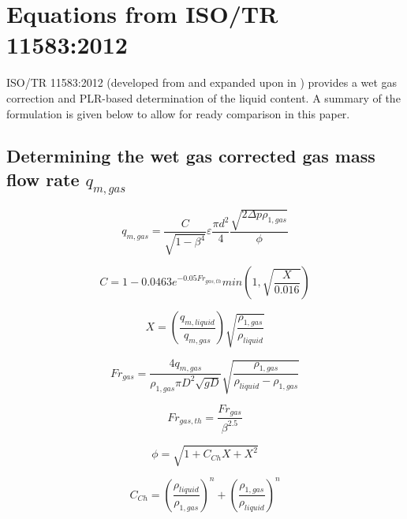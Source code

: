\documentclass[journal]{IEEEtran}
\begin{document}
\section{Equations from ISO/TR 11583:2012} \label{11583 Equations}

ISO/TR 11583:2012\cite{2012ISO/TRConduits} (developed from \cite{Reader-Harris2009} and expanded upon in \cite{Reader-Harris2015}) provides a wet gas correction and \acrshort{PLR}-based determination of the liquid content.  A summary of the formulation is given below to allow for ready comparison in this paper.

\subsection{Determining the wet gas corrected gas mass flow rate $q_{m,gas}$}

\begin{equation}
    q_{m,gas} = \frac{C}{\sqrt{1-\beta^{4}}}\varepsilon\frac{\pi d^{2}}{4}\frac{\sqrt{2\Delta p \rho_{1,gas}}}{\phi}
\end{equation}

\begin{equation}
    C = 1 - 0.0463 e^{-0.05 Fr_{gas,th}} min \left( 1, \sqrt{\frac{X}{0.016}} \right )
\end{equation}

\begin{equation}
    X = \left( \frac{q_{m,liquid}}{q_{m,gas}} \right)\sqrt{\frac{\rho_{1,gas}}{\rho_{liquid}}}
\end{equation}

\begin{equation}
    Fr_{gas} = \frac{4q_{m,gas}}{\rho_{1,gas} \pi D^{2} \sqrt{gD}} \sqrt{\frac{\rho_{1,gas}}{\rho_{liquid}-\rho_{1,gas}}}
\end{equation}

\begin{equation}
    Fr_{gas,th} = \frac{Fr_{gas}}{\beta ^{2.5}}
\end{equation}

\begin{equation}
    \phi = \sqrt{1+C_{Ch}X+X^2}
\end{equation}

\begin{equation}
    C_{Ch} = \left( \frac{\rho_{liquid}}{\rho_{1,gas}} \right) ^{n} +\left( \frac{\rho_{1,gas}}{\rho_{liquid}} \right) ^{n}
\end{equation}
\end{document}

